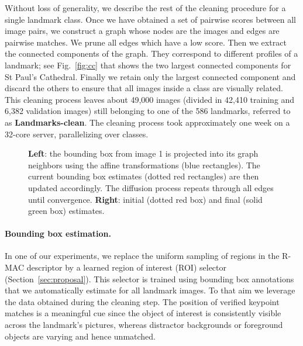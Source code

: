 \documentclass[twocolumn]{svjour3}          \smartqed  \usepackage{graphicx}
\begin{document}
Without loss of generality, we describe the rest of the cleaning procedure for a single landmark class. Once we have
obtained a set of pairwise scores between all image pairs, we construct a graph whose nodes are the images and edges are
pairwise matches.  We prune all edges which have a low score.
Then we extract the connected components of the graph.  They correspond to different
profiles of a landmark; see Fig.~\ref{fig:cc} that shows the two largest connected components for St Paul's Cathedral.
Finally we retain only the largest connected component and discard the others to ensure that all images inside a class are visually related.
This cleaning process leaves about 49,000 images (divided in 42,410 training and 6,382 validation images) still belonging to one of the 586 landmarks, referred to as \textbf{Landmarks-clean}. 
The cleaning process took approximately one week on a 32-core server, parallelizing over classes.

\begin{figure*}[ht!]
\begin{centering}
\par\end{centering}
\caption{\label{fig:diffusion}\textbf{Left}: the bounding box from image 1 is projected
into its graph neighbors using the affine transformations (blue rectangles). 
The current bounding box estimates (dotted red rectangles) are then updated accordingly.
The diffusion process repeats through all edges until convergence.
\textbf{Right}: initial (dotted red box) and final (solid green box) estimates.}
\end{figure*}


{\paragraph{Bounding box estimation.}
In one of our experiments, we replace the uniform sampling of regions in
the R-MAC descriptor by a learned region of interest (ROI) selector (Section~\ref{sec:proposal}).
This selector is trained using bounding box annotations that we automatically estimate for all landmark images.
To that aim we leverage the data obtained during the cleaning step.
The position of verified keypoint matches is a meaningful cue since the object of interest is consistently
visible across the landmark's pictures, whereas distractor backgrounds or foreground objects are varying and hence
unmatched.}
\end{document}
